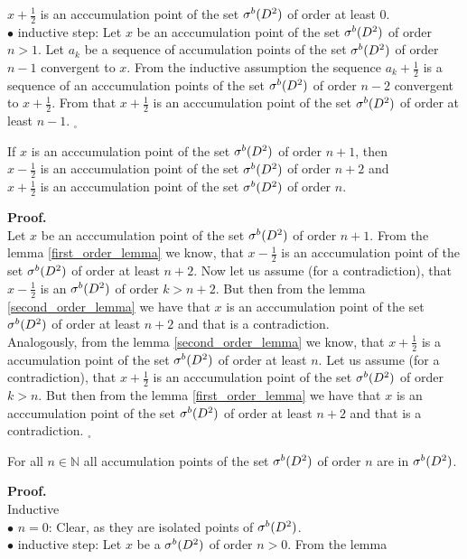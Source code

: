 $x + \frac{1}{2}$ is an acccumulation point of the set ${\mathcal{\sigma}^b(D^2)}$ of order at least $0$. \\
$\bullet$ inductive step: Let $x$ be an acccumulation point of the set ${\mathcal{\sigma}^b(D^2)}$ of order $n > 1$. 
Let $a_k$ be a sequence of accumulation points of the set ${\mathcal{\sigma}^b(D^2)}$ of order $n-1$ convergent to $x$. 
From the inductive assumption the sequence $a_k + \frac{1}{2}$ is a sequence of an acccumulation
 points of the set ${\mathcal{\sigma}^b(D^2)}$ of order $n-2$ convergent to $x + \frac{1}{2}$. From that 
 $x + \frac{1}{2}$ is an acccumulation point of the set ${\mathcal{\sigma}^b(D^2)}$ of order at least $n-1$. $_\square$ 
\begin{lemma}\label{third_order_lemma}
If $x$ is an acccumulation point of the set ${\mathcal{\sigma}^b(D^2)}$ of order $n+1$, then \\
$x - \frac{1}{2}$ is an acccumulation point of the set ${\mathcal{\sigma}^b(D^2)}$ of order $n+2$ and \\
$x + \frac{1}{2}$ is an acccumulation point of the set ${\mathcal{\sigma}^b(D^2)}$ of order $n$. 
\end{lemma}
\noindent\textbf{Proof.} \\
Let $x$ be an acccumulation point of the set ${\mathcal{\sigma}^b(D^2)}$ of order $n+1$. From the lemma 
 \ref{first_order_lemma} we know, that $x - \frac{1}{2}$ is an acccumulation point of the set 
 ${\mathcal{\sigma}^b(D^2)}$ of order at least $n+2$. Now let us assume (for a contradiction), that $x - \frac{1}{2}$ 
 is an \apots ${\mathcal{\sigma}^b(D^2)}$ of order $k>n+2$. But then from the lemma \ref{second_order_lemma} 
 we have that $x$ is an acccumulation point of the set ${\mathcal{\sigma}^b(D^2)}$ of order at least $n+2$ and that 
 is a contradiction. \\
Analogously, from the lemma \ref{second_order_lemma} we know, that $x + \frac{1}{2}$ is a 
accumulation point of the set ${\mathcal{\sigma}^b(D^2)}$ of order at least $n$. Let us assume (for a contradiction), 
that $x+ \frac{1}{2}$ is an acccumulation point of the set ${\mathcal{\sigma}^b(D^2)}$ of order $k>n$. But then 
from the lemma \ref{first_order_lemma} we have that $x$ is an acccumulation point of the set ${\mathcal{\sigma}^b(D^2)}$ 
of order at least $n+2$ and that is a contradiction. $_\square$ 
\begin{lemma}\label{accumulations_points_of_the_set}
For all $n \in \mathbb{N}$ all accumulation points of the set ${\mathcal{\sigma}^b(D^2)}$ of order $n$ are in ${\mathcal{\sigma}^b(D^2)}$.
\end{lemma}
\noindent\textbf{Proof.} \\
Inductive \\
$\bullet$ $n=0$: Clear, as they are isolated points of ${\mathcal{\sigma}^b(D^2)}$. \\
$\bullet$ inductive step: Let $x$ be a \apots  ${\mathcal{\sigma}^b(D^2)}$ of order $n>0$. From the lemma 
